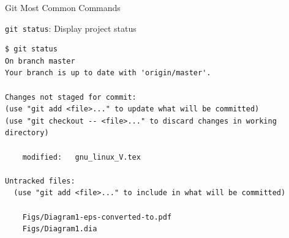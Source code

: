 \begin{frame}[t,fragile]{Git Most Common Commands}
      \begin{block}{\alert{\texttt{git status}}: Display project status}
          {\scriptsize 
          \begin{lstlisting}
$ git status
On branch master
Your branch is up to date with 'origin/master'.

Changes not staged for commit:
(use "git add <file>..." to update what will be committed)
(use "git checkout -- <file>..." to discard changes in working directory)

	modified:   gnu_linux_V.tex

Untracked files:
  (use "git add <file>..." to include in what will be committed)

	Figs/Diagram1-eps-converted-to.pdf
	Figs/Diagram1.dia

\end{lstlisting}
}      
\end{block}  
  
\end{frame}
